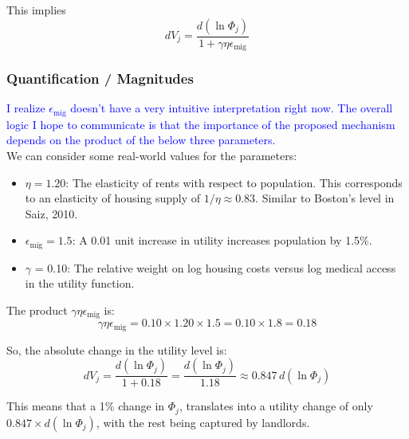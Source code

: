 \documentclass[11pt]{article}
\begin{document}
This implies
\begin{equation}
 dV_j = \frac{d(\ln \Phi_j)}{1 + \gamma\eta\epsilon_{\text{mig}}} \label{eq:final_dV}
\end{equation}


\subsubsection*{Quantification / Magnitudes}

\textcolor{blue}{I realize $\epsilon_{\text{mig}}$ doesn't have a very intuitive interpretation right now. The overall logic I hope to communicate is that the importance of the proposed mechanism depends on the product of the below three parameters. }  \\
We can consider some real-world values for the parameters:

\begin{itemize}
    \item $\eta = 1.20$: The elasticity of rents with respect to population. This corresponds to an elasticity of housing supply of $1/\eta \approx 0.83$. Similar to Boston's level in Saiz, 2010. 
    \item $\epsilon_{\text{mig}} = 1.5$: A 0.01 unit increase in utility increases population by 1.5\%.  %
    \item $\gamma$ = 0.10: The relative weight on log housing costs versus log medical access in the  utility function.
\end{itemize}

The product $\gamma\eta\epsilon_{\text{mig}}$ is:
$$ \gamma\eta\epsilon_{\text{mig}} = 0.10 \times 1.20 \times 1.5 = 0.10 \times 1.8 = 0.18 $$

So, the absolute change in the utility level is:
$$ dV_j = \frac{d(\ln \Phi_j)}{1 + 0.18} = \frac{d(\ln \Phi_j)}{1.18} \approx 0.847 \, d(\ln \Phi_j) $$

This means that a 1\% change in $\Phi_j$, translates into a utility change of only $0.847 \times d(\ln \Phi_j)$, with the rest being captured by landlords. 
\end{document}
